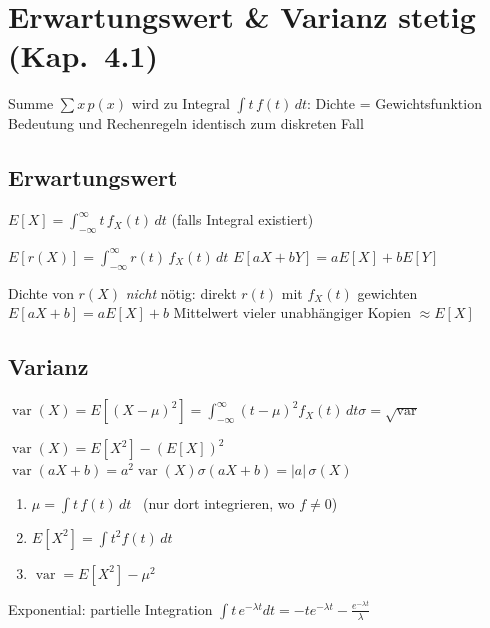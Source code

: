 \section{Erwartungswert \& Varianz stetig (Kap.\ 4.1)}

\begin{merke}
\begin{itemize}
\pfeil Summe $\sum x\,p(x)$ wird zu Integral $\int t\,f(t)\,dt$: Dichte = Gewichtsfunktion
\pfeil Bedeutung und Rechenregeln identisch zum diskreten Fall
\end{itemize}
\end{merke}

\subsection{Erwartungswert}
\begin{formel}
$\displaystyle E[X]=\int_{-\infty}^{\infty}t\,f_X(t)\,dt$ \quad (falls Integral existiert)
\end{formel}
\begin{formel}
$\displaystyle E[r(X)]=\int_{-\infty}^{\infty}r(t)\,f_X(t)\,dt$\qquad
$E[aX+bY]=aE[X]+bE[Y]$
\end{formel}
\begin{itemize}
\pfeil Dichte von $r(X)$ \emph{nicht} nötig: direkt $r(t)$ mit $f_X(t)$ gewichten
\pfeil $E[aX+b]=aE[X]+b$
\pfeil Mittelwert vieler unabhängiger Kopien $\approx E[X]$
\end{itemize}

\subsection{Varianz}
\begin{formel}
$\displaystyle\operatorname{var}(X)=E[(X-\mu)^2]=\int_{-\infty}^\infty(t-\mu)^2f_X(t)\,dt$\qquad $\sigma=\sqrt{\operatorname{var}}$
\end{formel}
\begin{formel}
$\operatorname{var}(X)=E[X^2]-(E[X])^2$\\[1pt]
$\operatorname{var}(aX+b)=a^2\operatorname{var}(X)$\qquad $\sigma(aX+b)=|a|\,\sigma(X)$
\end{formel}

\begin{merke}[{{Rechenschema}}]
\begin{enumerate}[label=\arabic*.,leftmargin=*]
\item $\mu=\int t\,f(t)\,dt$ \ (nur dort integrieren, wo $f\ne0$)
\item $E[X^2]=\int t^2f(t)\,dt$
\item $\operatorname{var}=E[X^2]-\mu^2$
\end{enumerate}
\begin{itemize}
\pfeil Exponential: partielle Integration $\int t\,e^{-\lambda t}dt=-te^{-\lambda t}-\tfrac{e^{-\lambda t}}{\lambda}$
\end{itemize}
\end{merke}


